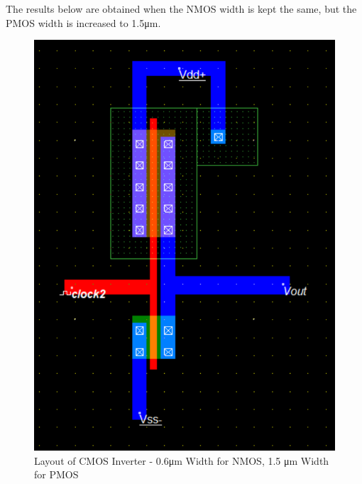 \FloatBarrier

The results below are obtained when the NMOS width is kept the same, but the PMOS width is increased to 1.5\si{\micro\meter}.

\FloatBarrier

\begin{figure}[h!]
	\centering
	\includegraphics[scale=0.75]{./images/inverter_06nmos15pmos.PNG}
	\caption{Layout of CMOS Inverter - 0.6\si{\micro\meter} Width for NMOS, 1.5 \si{\micro\meter} Width for PMOS}
	\label{fig:inverter_06nmos15pmos}
\end{figure}

\FloatBarrier

\FloatBarrier

